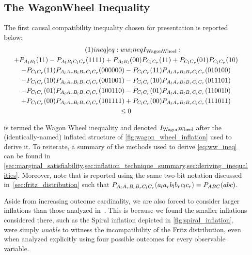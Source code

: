\documentclass[aps, 10pt, english, twoside, pra, nofootinbib, tightenlines, longbibliography, superscriptaddress]{revtex4-1}
\begin{document}
    \subsection{The WagonWheel Inequality}
    The first causal compatibility inequality chosen for presentation is reported below:
    \begin{equation*}
    \begin{gathered}
        \eq\label[ineq]{eq:ww_ineq}
        I\tsb{WagonWheel} : \\
        +P_{A_{l}B_{l}}(11) -P_{A_{l}B_{l}C_{l}C_{r}}(1111) +P_{A_{l}B_{l}}(00) P_{C_{l}C_{r}}(11) +P_{C_{l}C_{r}}(01) P_{C_{l}C_{r}}(10) \\
        -P_{C_{l}C_{r}}(11) P_{A_{l}A_{r}B_{l}B_{r}C_{l}C_{r}}(000000) -P_{C_{l}C_{r}}(11) P_{A_{l}A_{r}B_{l}B_{r}C_{l}C_{r}}(010100) \\
        -P_{C_{l}C_{r}}(10) P_{A_{l}A_{r}B_{l}B_{r}C_{l}C_{r}}(001001) -P_{C_{l}C_{r}}(10) P_{A_{l}A_{r}B_{l}B_{r}C_{l}C_{r}}(011101) \\
        -P_{C_{l}C_{r}}(01) P_{A_{l}A_{r}B_{l}B_{r}C_{l}C_{r}}(100110) -P_{C_{l}C_{r}}(01) P_{A_{l}A_{r}B_{l}B_{r}C_{l}C_{r}}(110010) \\
        +P_{C_{l}C_{r}}(00) P_{A_{l}A_{r}B_{l}B_{r}C_{l}C_{r}}(101111) +P_{C_{l}C_{r}}(00) P_{A_{l}A_{r}B_{l}B_{r}C_{l}C_{r}}(111011) \\
        \leq 0
    \end{gathered}
    \end{equation*}

     is termed the Wagon Wheel inequality and denoted $I_\text{WagonWheel}$ after the (identically-named) inflated structure of \cref{fig:wagon_wheel_inflation} used to derive it. To reiterate, a summary of the methods used to derive \cref{eq:ww_ineq} can be found in \cref{sec:marginal_satisfiability,sec:inflation_technique_summary,sec:deriving_inequalities}. Moreover, note that  is reported using the same two-bit notation discussed in~\cref{sec:fritz_distribution} such that $\prob[A_{l}A_{r}B_{l}B_{r}C_{l}C_{r}][a_{l}a_{r}b_{l}b_{r}c_{l}c_{r}] = \prob[ABC][abc]$.

    Aside from increasing outcome cardinality, we are also forced to consider larger inflations than those analyzed in~\cite{Inflation}. This is because we found the smaller inflations considered there, such as the Spiral inflation depicted in \cref{fig:spiral_inflation}, were simply \textit{unable} to witness the incompatibility of the Fritz distribution, even when analyzed explicitly using four possible outcomes for every observable variable.
\end{document}
